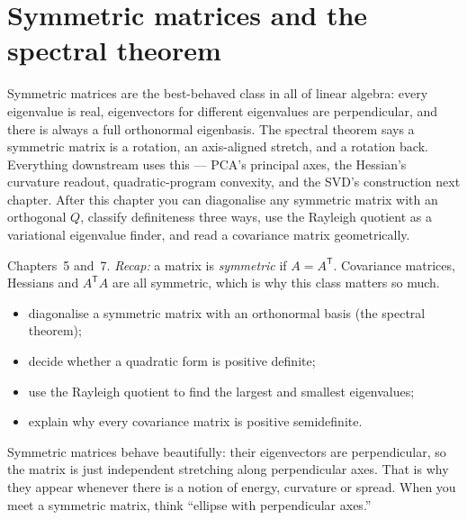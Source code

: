 \chapter{Symmetric matrices and the spectral theorem}\label{ch:spectral}

Symmetric matrices are the best-behaved class in all of linear algebra:
every eigenvalue is real, eigenvectors for different eigenvalues are
perpendicular, and there is always a full orthonormal eigenbasis. The
spectral theorem says a symmetric matrix is a rotation, an axis-aligned
stretch, and a rotation back. Everything downstream uses this --- PCA's
principal axes, the Hessian's curvature readout, quadratic-program
convexity, and the SVD's construction next chapter. After this chapter
you can diagonalise any symmetric matrix with an orthogonal $Q$,
classify definiteness three ways, use the Rayleigh quotient as a variational
eigenvalue finder, and read a covariance matrix geometrically.

\begin{rulebox}
Chapters~5 and~7. \emph{Recap:} a matrix is \emph{symmetric} if $A=A^{\mathsf T}$. Covariance matrices, Hessians and $A^{\mathsf T}A$ are all symmetric, which is why this class matters so much.
\end{rulebox}
\begin{wins}
\begin{itemize}
\item diagonalise a symmetric matrix with an orthonormal basis (the spectral theorem);
\item decide whether a quadratic form is positive definite;
\item use the Rayleigh quotient to find the largest and smallest eigenvalues;
\item explain why every covariance matrix is positive semidefinite.
\end{itemize}
\end{wins}
\begin{principle}
Symmetric matrices behave beautifully: their eigenvectors are perpendicular, so the matrix is just independent stretching along perpendicular axes. That is why they appear whenever there is a notion of energy, curvature or spread. When you meet a symmetric matrix, think ``ellipse with perpendicular axes.''
\end{principle}

